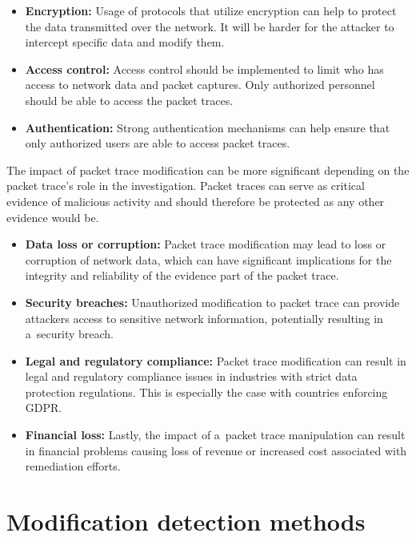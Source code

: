 \documentclass[
  printed,     %
  color,       %
  oneside,     %
  nosansbold,  %
  nocolorbold, %
  nolof,         %
  nolot,         %
]{fithesis4}
\begin{document}
\begin{itemize}
    \item \textbf{Encryption:} Usage of protocols that utilize encryption can help to protect the data transmitted over the network. It will be harder for the attacker to intercept specific data and modify them. 
    \item \textbf{Access control:} Access control should be implemented to limit who has access to network data and packet captures. Only authorized personnel should be able to access the packet traces.
    \item \textbf{Authentication:} Strong authentication mechanisms can help ensure that only authorized users are able to access packet traces.
\end{itemize}

The impact of packet trace modification can be more significant depending on the packet trace's role in the investigation. Packet traces can serve as critical evidence of malicious activity and should therefore be protected as any other evidence would be.

\begin{itemize}
    \item \textbf{Data loss or corruption:} Packet trace modification may lead to loss or corruption of network data, which can have significant implications for the integrity and reliability of the evidence part of the packet trace.
    \item \textbf{Security breaches:} Unauthorized modification to packet trace can provide attackers access to sensitive network information, potentially resulting in a~security breach.
    \item \textbf{Legal and regulatory compliance:} Packet trace modification can result in legal and regulatory compliance issues in industries with strict data protection regulations. This is especially the case with countries enforcing GDPR.
    \item \textbf{Financial loss:} Lastly, the impact of a~packet trace manipulation can result in financial problems causing loss of revenue or increased cost associated with remediation efforts.
\end{itemize}



\newpage
\chapter{Modification detection methods}
\label{chap:mdm}
\end{document}
